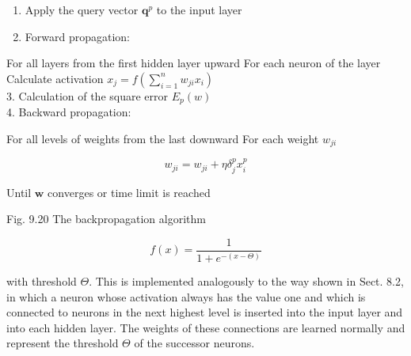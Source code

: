 \documentclass[10pt]{book}
\begin{document}
\begin{center}
\begin{enumerate}
\begin{center}
\begin{center}
\begin{center}
\begin{enumerate}
  \item Apply the query vector $\boldsymbol{q}^{p}$ to the input layer
  \item Forward propagation:
\end{enumerate}

For all layers from the first hidden layer upward For each neuron of the layer Calculate activation $x_{j}=f\left(\sum_{i=1}^{n} w_{j i} x_{i}\right)$\\
3. Calculation of the square error $E_{p}(w)$\\
4. Backward propagation:

For all levels of weights from the last downward For each weight $w_{j i}$

$$
w_{j i}=w_{j i}+\eta \delta_{j}^{p} x_{i}^{p}
$$

Until $\boldsymbol{w}$ converges or time limit is reached

Fig. 9.20 The backpropagation algorithm

$$
f(x)=\frac{1}{1+e^{-(x-\Theta)}}
$$

with threshold $\Theta$. This is implemented analogously to the way shown in Sect. 8.2, in which a neuron whose activation always has the value one and which is connected to neurons in the next highest level is inserted into the input layer and into each hidden layer. The weights of these connections are learned normally and represent the threshold $\Theta$ of the successor neurons.



\end{center}
\end{center}
\end{center}
\end{enumerate}
\end{center}
\end{document}
